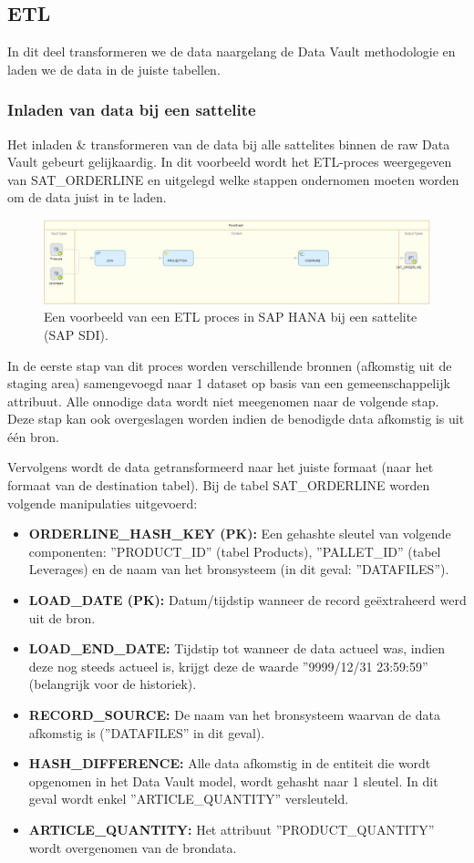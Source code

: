 \subsection{ETL}
In dit deel transformeren we de data naargelang de Data Vault methodologie en laden we de data in de juiste tabellen. 

\subsubsection{Inladen van data bij een sattelite}
Het inladen \& transformeren van de data bij alle sattelites binnen de raw Data Vault gebeurt gelijkaardig. In dit voorbeeld wordt het ETL-proces weergegeven van SAT\_ORDERLINE en uitgelegd welke stappen ondernomen moeten worden om de data juist in te laden.
\begin{figure}[h]
	\centering
	\includegraphics[scale=0.45]{../images/DV_FG_sattelite.png}
	\caption{Een voorbeeld van een ETL proces in SAP HANA bij een sattelite (SAP SDI).}
	\label{fig:etlsat}
\end{figure}
		
In de eerste stap van dit proces worden verschillende bronnen (afkomstig uit de staging area) samengevoegd naar 1 dataset op basis van een gemeenschappelijk attribuut. Alle onnodige data wordt niet meegenomen naar de volgende stap. Deze stap kan ook overgeslagen worden indien de benodigde data afkomstig is uit één bron.

Vervolgens wordt de data getransformeerd naar het juiste formaat (naar het formaat van de destination tabel). Bij de tabel SAT\_ORDERLINE worden volgende manipulaties uitgevoerd:

\begin{itemize}
	\item \textbf{ORDERLINE\_HASH\_KEY (PK):} Een gehashte sleutel van volgende componenten: ''PRODUCT\_ID'' (tabel Products), ''PALLET\_ID'' (tabel Leverages) en de naam van het bronsysteem (in dit geval: ''DATAFILES'').
	\item \textbf{LOAD\_DATE (PK):} Datum/tijdstip wanneer de record geëxtraheerd werd uit de bron.
	\item \textbf{LOAD\_END\_DATE:} Tijdstip tot wanneer de data actueel was, indien deze nog steeds actueel is, krijgt deze de waarde ''9999/12/31 23:59:59'' (belangrijk voor de historiek).
	\item \textbf{RECORD\_SOURCE:} De naam van het bronsysteem waarvan de data afkomstig is (''DATAFILES'' in dit geval).
	\item \textbf{HASH\_DIFFERENCE:} Alle data afkomstig in de entiteit die wordt opgenomen in het Data Vault model, wordt gehasht naar 1 sleutel. In dit geval wordt enkel ''ARTICLE\_QUANTITY'' versleuteld. 
	\item \textbf{ARTICLE\_QUANTITY:} Het attribuut ''PRODUCT\_QUANTITY'' wordt overgenomen van de brondata.
\end{itemize} 

